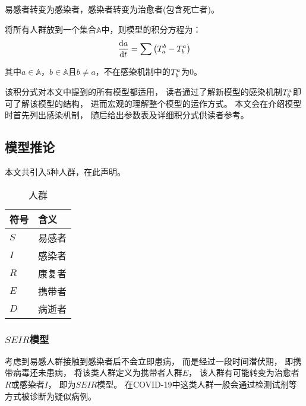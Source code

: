 \par 易感者转变为感染者，感染者转变为治愈者(包含死亡者)。
\par 将所有人群放到一个集合$\mathbb{A}$中，则模型的积分方程为：
\begin{equation}
    \frac{\mathrm{d}a}{\mathrm{d}t} = \sum\left(T^{b}_{a}-T^{a}_{b}\right)
\end{equation}
\par 其中$a\in\mathbb{A}$，$b\in\mathbb{A}$且$b\not=a$，不在感染机制中的$T^{a}_{b}$为$0$。
\par 该积分式对本文中提到的所有模型都适用，
读者通过了解新模型的感染机制$T^{a}_{b}$即可了解该模型的结构，
进而宏观的理解整个模型的运作方式。
本文会在介绍模型时首先列出感染机制，
随后给出参数表及详细积分式供读者参考。
\subsection{模型推论}
\par 本文共引入$5$种人群，在此声明。
\begin{table}[H]
    \centering
    \caption{人群}
    \begin{tabular}{ll}
        \hline
        符号 & 含义   \\
        \hline
        $S$  & 易感者 \\
        $I$  & 感染者 \\
        $R$  & 康复者 \\
        $E$  & 携带者 \\
        $D$  & 病逝者 \\
        \hline
    \end{tabular}
\end{table}
\subsubsection{$SEIR$模型}
\par 考虑到易感人群接触到感染者后不会立即患病，
而是经过一段时间潜伏期，
即携带病毒还未患病，
将该类人群定义为携带者人群$E$，
该人群有可能转变为治愈者$R$或感染者$I$，
即为$SEIR$模型。
在COVID-19中这类人群一般会通过检测试剂等方式被诊断为疑似病例。
